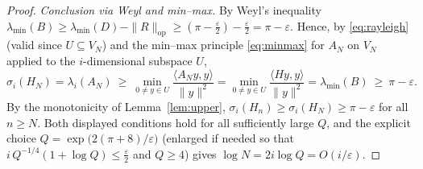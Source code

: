 \documentclass[12pt]{article}
\theoremstyle{remark}
\begin{document}
\begin{proof}
\smallskip
\noindent\emph{Conclusion via Weyl and min--max.} By Weyl's inequality
$\lambda_{\min}(B)\ge\lambda_{\min}(D)-\|R\|_{\mathrm{op}}\ge(\pi-\tfrac\varepsilon2)-\tfrac\varepsilon2
=\pi-\varepsilon$. Hence, by \eqref{eq:rayleigh} (valid since $U\subseteq V_N$) and the min--max
principle \eqref{eq:minmax} for $A_N$ on $V_N$ applied to the $i$-dimensional subspace $U$,
\[
\sigma_i(H_N)=\lambda_i(A_N)\ \ge\ \min_{0\ne y\in U}\frac{\langle A_N y,y\rangle}{\|y\|^2}
=\min_{0\ne y\in U}\frac{\langle Hy,y\rangle}{\|y\|^2}=\lambda_{\min}(B)\ \ge\ \pi-\varepsilon .
\]
By the monotonicity of Lemma~\ref{lem:upper}, $\sigma_i(H_n)\ge\sigma_i(H_N)\ge\pi-\varepsilon$ for
all $n\ge N$. Both displayed conditions hold for all sufficiently large $Q$, and the explicit
choice $Q=\exp\bigl(2(\pi+8)/\varepsilon\bigr)$ (enlarged if needed so that
$i\,Q^{-1/4}(1+\log Q)\le\tfrac\varepsilon2$ and $Q\ge4$) gives $\log N=2i\log Q=O(i/\varepsilon)$.
\end{proof}
\end{document}
